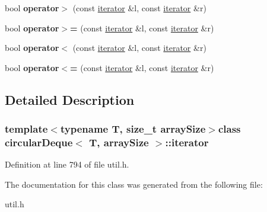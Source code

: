 \begin{DoxyCompactItemize}
\item 
\hypertarget{classcircularDeque_1_1iterator_a90290eb7089c69859452250df85a3756}{bool {\bfseries operator$>$} (const \hyperlink{classcircularDeque_1_1iterator}{iterator} \&l, const \hyperlink{classcircularDeque_1_1iterator}{iterator} \&r)}\label{classcircularDeque_1_1iterator_a90290eb7089c69859452250df85a3756}

\item 
\hypertarget{classcircularDeque_1_1iterator_ab23d72047381dab9b9888b88d4662d15}{bool {\bfseries operator$>$=} (const \hyperlink{classcircularDeque_1_1iterator}{iterator} \&l, const \hyperlink{classcircularDeque_1_1iterator}{iterator} \&r)}\label{classcircularDeque_1_1iterator_ab23d72047381dab9b9888b88d4662d15}

\item 
\hypertarget{classcircularDeque_1_1iterator_abaee5f90fefec343d2a1bc4a7ffaa1d0}{bool {\bfseries operator$<$} (const \hyperlink{classcircularDeque_1_1iterator}{iterator} \&l, const \hyperlink{classcircularDeque_1_1iterator}{iterator} \&r)}\label{classcircularDeque_1_1iterator_abaee5f90fefec343d2a1bc4a7ffaa1d0}

\item 
\hypertarget{classcircularDeque_1_1iterator_a48af46c9be3de4731ed1e9fc1aaf1421}{bool {\bfseries operator$<$=} (const \hyperlink{classcircularDeque_1_1iterator}{iterator} \&l, const \hyperlink{classcircularDeque_1_1iterator}{iterator} \&r)}\label{classcircularDeque_1_1iterator_a48af46c9be3de4731ed1e9fc1aaf1421}

\end{DoxyCompactItemize}


\subsection{Detailed Description}
\subsubsection*{template$<$typename T, size\+\_\+t array\+Size$>$class circular\+Deque$<$ T, array\+Size $>$\+::iterator}



Definition at line 794 of file util.\+h.



The documentation for this class was generated from the following file\+:\begin{DoxyCompactItemize}
\item 
util.\+h\end{DoxyCompactItemize}
